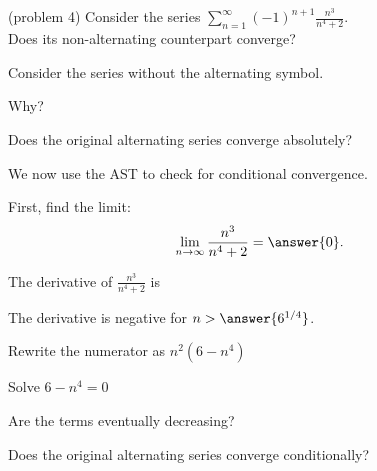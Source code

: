 \documentclass{ximera}
\begin{document}
\begin{problem}(problem 4)
Consider the series $\displaystyle{\sum_{n=1}^\infty (-1)^{n+1} \frac{n^3}{n^4 + 2}}$.\\
Does its non-alternating counterpart converge?
\begin{hint} 
Consider the series without the alternating symbol.
\end{hint}
\begin{multipleChoice}
\end{multipleChoice}

Why?
\begin{multipleChoice}
\end{multipleChoice}




Does the original alternating series converge absolutely?
\begin{multipleChoice}
\end{multipleChoice}

We now use the AST to check for conditional convergence.

First, find the limit:
\[
\lim_{n\to\infty} \frac{n^3}{n^4 + 2} = \answer{0}.
\]

The derivative of $\displaystyle{\frac{n^3}{n^4 + 2}}$ is  

\begin{multipleChoice}
\end{multipleChoice}


The derivative is negative for $n > \answer{6^{1/4}}$.
\begin{hint}
Rewrite the numerator as $n^2(6-n^4)$
\end{hint}
\begin{hint}
Solve $6 - n^4 = 0$
\end{hint}

Are the terms eventually decreasing?
\begin{multipleChoice}
\end{multipleChoice}


Does the original alternating series converge conditionally?
\begin{multipleChoice}
\end{multipleChoice}


\end{problem}
\end{document}
